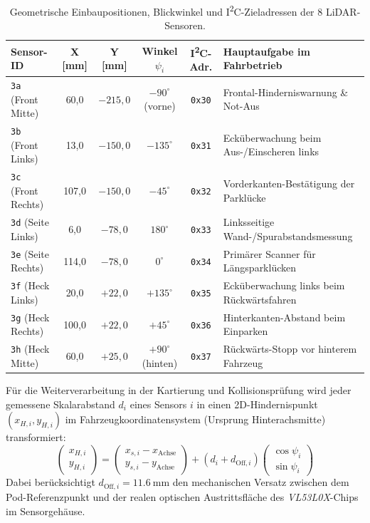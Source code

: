 \begin{table}[htbp]
\centering
\caption{Geometrische Einbaupositionen, Blickwinkel und I\textsuperscript{2}C-Zieladressen der 8 LiDAR-Sensoren.}
\label{tab:lidar_koord}
\begin{tabular}{@{}l c c c c l@{}}
\toprule
\textbf{Sensor-ID} & \textbf{X [mm]} & \textbf{Y [mm]} & \textbf{Winkel $\psi_i$} & \textbf{I\textsuperscript{2}C-Adr.} & \textbf{Hauptaufgabe im Fahrbetrieb} \\
\midrule
\texttt{3a} (Front Mitte) & 60,0 & $-215,0$ & $-90^\circ$ (vorne) & \texttt{0x30} & Frontal-Hinderniswarnung \& Not-Aus \\
\texttt{3b} (Front Links) & 13,0 & $-150,0$ & $-135^\circ$ & \texttt{0x31} & Ecküberwachung beim Aus-/Einscheren links \\
\texttt{3c} (Front Rechts) & 107,0 & $-150,0$ & $-45^\circ$ & \texttt{0x32} & Vorderkanten-Bestätigung der Parklücke \\
\texttt{3d} (Seite Links) & 6,0 & $-78,0$ & $180^\circ$ & \texttt{0x33} & Linksseitige Wand-/Spurabstandsmessung \\
\texttt{3e} (Seite Rechts) & 114,0 & $-78,0$ & $0^\circ$ & \texttt{0x34} & Primärer Scanner für Längsparklücken \\
\texttt{3f} (Heck Links) & 20,0 & $+22,0$ & $+135^\circ$ & \texttt{0x35} & Ecküberwachung links beim Rückwärtsfahren \\
\texttt{3g} (Heck Rechts) & 100,0 & $+22,0$ & $+45^\circ$ & \texttt{0x36} & Hinterkanten-Abstand beim Einparken \\
\texttt{3h} (Heck Mitte) & 60,0 & $+25,0$ & $+90^\circ$ (hinten) & \texttt{0x37} & Rückwärts-Stopp vor hinterem Fahrzeug \\
\bottomrule
\end{tabular}
\end{table}

Für die Weiterverarbeitung in der Kartierung und Kollisionsprüfung wird jeder gemessene Skalarabstand $d_i$ eines Sensors $i$ in einen 2D-Hindernispunkt $(x_{H,i}, y_{H,i})$ im Fahrzeugkoordinatensystem (Ursprung Hinterachsmitte) transformiert:
\begin{equation}
  \begin{pmatrix} x_{H,i} \\ y_{H,i} \end{pmatrix}
  =
  \begin{pmatrix} x_{s,i} - x_{\mathrm{Achse}} \\ y_{s,i} - y_{\mathrm{Achse}} \end{pmatrix}
  + (d_i + d_{\mathrm{Off},i})
  \begin{pmatrix} \cos\psi_i \\ \sin\psi_i \end{pmatrix}
  \label{eq:sensor_tf}
\end{equation}
Dabei berücksichtigt $d_{\mathrm{Off},i} = \qty{11,6}{\milli\meter}$ den mechanischen Versatz zwischen dem Pod-Referenzpunkt und der realen optischen Austrittsfläche des \emph{VL53L0X}-Chips im Sensorgehäuse.

